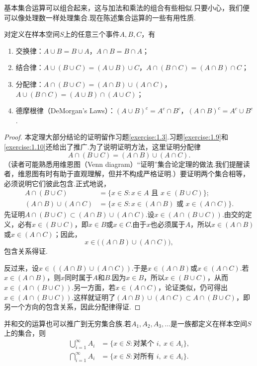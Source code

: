 基本集合运算可以组合起来，这与加法和乘法的组合有些相似.只要小心，我们便可以像处理数一样处理集合.现在陈述集合运算的一些有用性质.
\begin{theorem}\label{thm:1.1.4}
对定义在样本空间$S$上的任意三个事件$A,B,C$，有
\begin{enumerate}
\item[(a)] 交换律：$A\cup B=B\cup A$，$A\cap B=B\cap A$；
\item[(b)] 结合律：$A\cup(B\cup C)=(A\cup B)\cup C$，$A\cap(B\cap C)=(A\cap B)\cap C$；
\item[(c)] 分配律：$A\cap(B\cup C)=(A\cap B)\cup(A\cap C)$，$A\cup(B\cap C)=(A\cup B)\cap(A\cup C)$；
\item[(d)] 德摩根律（DeMorgan's Laws）：$(A\cup B)^c=A^c\cap B^c$，$(A\cap B)^c=A^c\cup B^c$.
\end{enumerate}
\end{theorem}
\begin{proof}
本定理大部分结论的证明留作习题\ref{exercise:1.3}.习题\ref{exercise:1.9}和\ref{exercise:1.10}还给出了推广.为了说明证明方法，这里证明分配律
$$A\cap(B\cup C)=(A\cap B)\cup(A\cap C).$$
（读者可能熟悉用维恩图（Venn diagram）“证明”集合论定理的做法.我们提醒读者，维恩图有时有助于直观理解，但并不构成严格证明.）要证明两个集合相等，必须说明它们彼此包含.正式地说，
$$\begin{aligned}
A\cap(B\cup C)&=\{x\in S:x\in A\text{ 且 }x\in(B\cup C)\};\\
(A\cap B)\cup(A\cap C)&=\{x\in S:x\in(A\cap B)\text{ 或 }x\in(A\cap C)\}.
\end{aligned}$$
先证明$A\cap(B\cup C)\subset(A\cap B)\cup(A\cap C)$.设$x\in(A\cap(B\cup C))$.由交的定义，必有$x\in(B\cup C)$，即$x\in B$或$x\in C$.由于$x$也必须属于$A$，所以$x\in(A\cap B)$或$x\in(A\cap C)$；因此，
$$x\in\bigl((A\cap B)\cup(A\cap C)\bigr),$$
包含关系得证.

反过来，设$x\in((A\cap B)\cup(A\cap C))$.于是$x\in(A\cap B)$或$x\in(A\cap C)$.若$x\in(A\cap B)$，则$x$同时属于$A$和$B$.因为$x\in B$，所以$x\in(B\cup C)$，从而$x\in(A\cap(B\cup C))$.另一方面，若$x\in(A\cap C)$，论证类似，仍可得出$x\in(A\cap(B\cup C))$.这样就证明了$(A\cap B)\cup(A\cap C)\subset A\cap(B\cup C)$，即另一个方向的包含关系，因此分配律得证.
\end{proof}
并和交的运算也可以推广到无穷集合族.若$A_1,A_2,A_3,\ldots$是一族都定义在样本空间$S$上的集合，则
$$\begin{aligned}
\bigcup_{i=1}^{\infty}A_i&=\{x\in S:\text{对某个 }i,\ x\in A_i\},\\
\bigcap_{i=1}^{\infty}A_i&=\{x\in S:\text{对所有 }i,\ x\in A_i\}.
\end{aligned}$$

